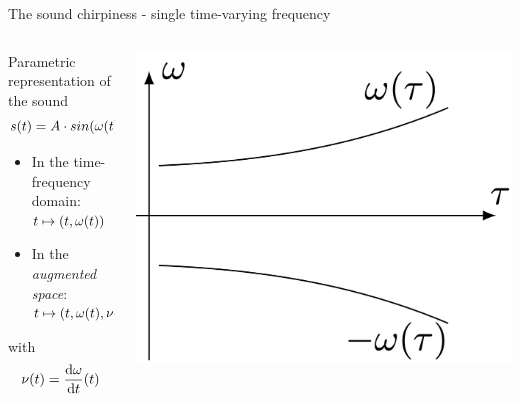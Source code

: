 \documentclass[10pt,american,ignorenonframetext,aspectratio=1610]{beamer}
\providecommand{\tightlist}{%
  \setlength{\itemsep}{0pt}\setlength{\parskip}{0pt}}
\theoremstyle{remark}
\begin{document}
\begin{frame}{The sound chirpiness - single time-varying frequency}
\protect\hypertarget{the-sound-chirpiness---single-time-varying-frequency}{}

\begin{columns}[T]
\begin{column}{0.7\textwidth}
Parametric representation of the sound \[s(t)=A\cdot sin(\omega(t) t)\]

\begin{itemize}
\tightlist
\item
  In the time-frequency domain: \(t\mapsto(t,\omega(t))\)
\item
  In the \emph{augmented space}: \(t\mapsto(t,\omega(t),\nu(t))\)
\end{itemize}

with \[\nu(t)=\frac{\mathrm{d}\omega}{\mathrm{d}t}(t)\]
\end{column}

\begin{column}{0.3\textwidth}
\includegraphics[width=1\textwidth,height=\textheight]{img/single_freq.png}
\end{column}
\end{columns}

\end{frame}
\end{document}
